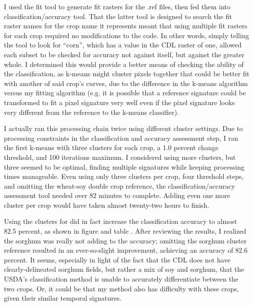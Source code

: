 I used the fit tool to generate fit rasters for the .ref files, then fed them into classification/accuracy tool. That the latter tool is designed to search the fit raster names for the crop name it represents meant that using multiple fit rasters for each crop required no modifications to the code. In other words, simply telling the tool to look for “corn”, which has a value in the CDL raster of one, allowed each subset to be checked for accuracy not against itself, but against the greater whole. I determined this would provide a better means of checking the ability of the classification, as k-means might cluster pixels together that could be better fit with another of said crop’s curves, due to the difference in the k-means algorithm versus my fitting algorithm (e.g. it is  possible that a reference signature could be transformed to fit a pixel signature very well even if the pixel signature looks very different from the reference to the k-means classifier).

I actually ran this processing chain twice using different cluster settings. Due to processing constraints in the classification and accuracy assessment step, I ran the first k-means with three clusters for each crop, a 1.0 percent change threshold, and 100 iterations maximum. I considered using more clusters, but three seemed to be optimal, finding multiple signatures while keeping processing times manageable. Even using only three clusters per crop, four threshold steps, and omitting the wheat-soy double crop reference, the classification/accuracy assessment tool needed over 82 minutes to complete. Adding even one more cluster per crop would have taken almost twenty-two hours to finish.

Using the clusters for did in fact increase the classification accuracy to almost 82.5 percent, as shown in figure  and table . After reviewing the results, I realized the sorghum was really not adding to the accuracy; omitting the sorghum cluster reference resulted in an ever-so-slight improvement, achieving an accuracy of 82.6 percent. It seems, especially in light of the fact that the CDL does not have clearly-delineated sorghum fields, but rather a mix of soy and sorghum, that the USDA’s classification method is unable to accurately differentiate between the two crops. Or, it could be that my method also has difficulty with these crops, given their similar temporal signatures. %

